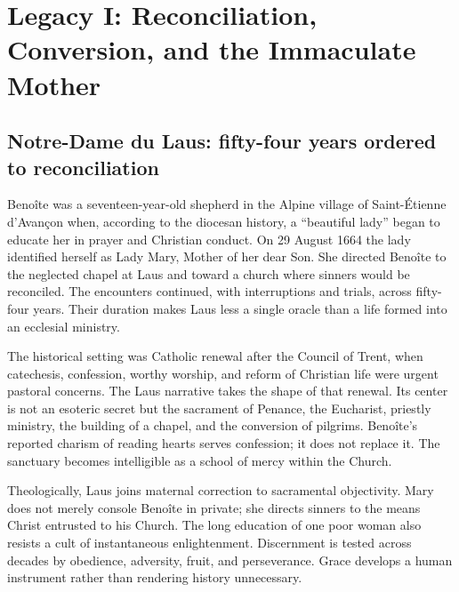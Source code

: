 \section{Legacy I: Reconciliation, Conversion, and the Immaculate Mother}

\subsection{Notre-Dame du Laus: fifty-four years ordered to reconciliation}


Benoîte was a seventeen-year-old shepherd in the Alpine village of Saint-Étienne d'Avançon when, according to the diocesan history, a ``beautiful lady'' began to educate her in prayer and Christian conduct. On 29 August 1664 the lady identified herself as Lady Mary, Mother of her dear Son. She directed Benoîte to the neglected chapel at Laus and toward a church where sinners would be reconciled. The encounters continued, with interruptions and trials, across fifty-four years. Their duration makes Laus less a single oracle than a life formed into an ecclesial ministry.

The historical setting was Catholic renewal after the Council of Trent, when catechesis, confession, worthy worship, and reform of Christian life were urgent pastoral concerns. The Laus narrative takes the shape of that renewal. Its center is not an esoteric secret but the sacrament of Penance, the Eucharist, priestly ministry, the building of a chapel, and the conversion of pilgrims. Benoîte's reported charism of reading hearts serves confession; it does not replace it. The sanctuary becomes intelligible as a school of mercy within the Church.

Theologically, Laus joins maternal correction to sacramental objectivity. Mary does not merely console Benoîte in private; she directs sinners to the means Christ entrusted to his Church. The long education of one poor woman also resists a cult of instantaneous enlightenment. Discernment is tested across decades by obedience, adversity, fruit, and perseverance. Grace develops a human instrument rather than rendering history unnecessary.

